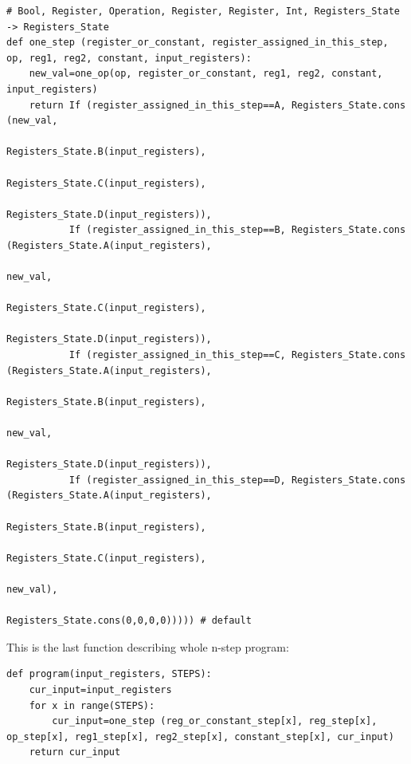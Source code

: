 \begin{lstlisting}
# Bool, Register, Operation, Register, Register, Int, Registers_State -> Registers_State
def one_step (register_or_constant, register_assigned_in_this_step, op, reg1, reg2, constant, input_registers):
    new_val=one_op(op, register_or_constant, reg1, reg2, constant, input_registers)
    return If (register_assigned_in_this_step==A, Registers_State.cons (new_val,
                                                                        Registers_State.B(input_registers), 
                                                                        Registers_State.C(input_registers), 
                                                                        Registers_State.D(input_registers)),
           If (register_assigned_in_this_step==B, Registers_State.cons (Registers_State.A(input_registers), 
                                                                        new_val,
                                                                        Registers_State.C(input_registers),
                                                                        Registers_State.D(input_registers)), 
           If (register_assigned_in_this_step==C, Registers_State.cons (Registers_State.A(input_registers), 
                                                                        Registers_State.B(input_registers), 
                                                                        new_val,
                                                                        Registers_State.D(input_registers)), 
           If (register_assigned_in_this_step==D, Registers_State.cons (Registers_State.A(input_registers), 
                                                                        Registers_State.B(input_registers), 
                                                                        Registers_State.C(input_registers), 
                                                                        new_val),
                                                  Registers_State.cons(0,0,0,0))))) # default
\end{lstlisting}

This is the last function describing whole n-step program:

\begin{lstlisting}
def program(input_registers, STEPS):
    cur_input=input_registers
    for x in range(STEPS):
        cur_input=one_step (reg_or_constant_step[x], reg_step[x], op_step[x], reg1_step[x], reg2_step[x], constant_step[x], cur_input)
    return cur_input
\end{lstlisting}

